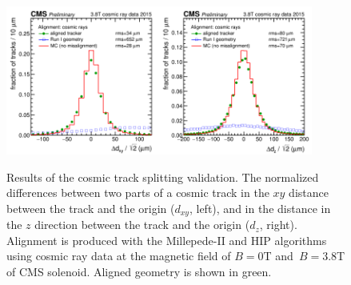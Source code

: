 
\begin{figure}[htb]
    \begin{center}
        \includegraphics[width=0.45\textwidth]{../figs/Alignment/AlRes_CRAFT_hist_Delta_dxy.png}\includegraphics[width=0.45\textwidth]{../figs/Alignment/AlRes_CRAFT_hist_Delta_dz.png}
    \end{center}
    \caption{Results of the cosmic track splitting validation. The normalized differences between two parts of a cosmic track in the $xy$ distance between the track and the origin ($d_{xy}$, left), and in the distance in the $z$ direction between the track and the origin ($d_z$, right). Alignment is produced with the Millepede-II and HIP algorithms using cosmic ray data at the magnetic field of $B=0$T and~$B=3.8$T of CMS solenoid. Aligned geometry is shown in green.}
    \label{fig:trackSplit}
\end{figure}

